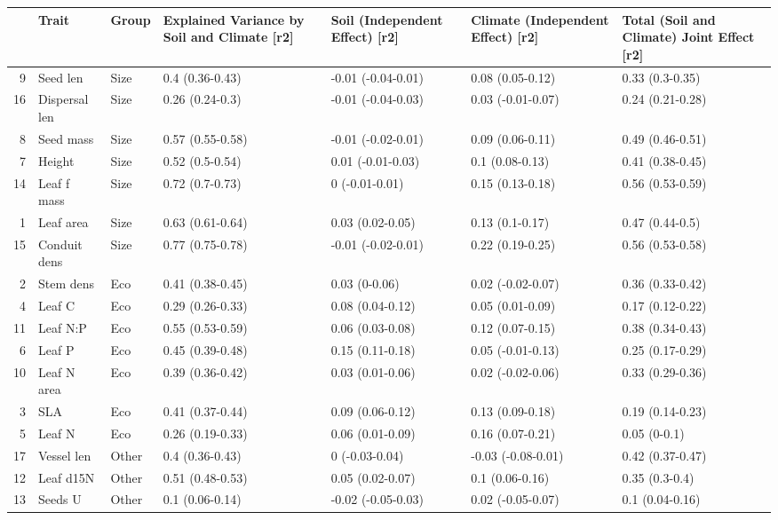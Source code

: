 \begin{table}[ht]
\centering
\begin{tabular}{rllllll}
  \hline
 & Trait & Group & Explained Variance by Soil and Climate [r2] & Soil (Independent Effect) [r2] & Climate (Independent Effect) [r2] & Total (Soil and Climate) Joint Effect [r2] \\ 
  \hline
9 & Seed len & Size & 0.4 (0.36-0.43) & -0.01 (-0.04-0.01) & 0.08 (0.05-0.12) & 0.33 (0.3-0.35) \\ 
  16 & Dispersal len & Size & 0.26 (0.24-0.3) & -0.01 (-0.04-0.03) & 0.03 (-0.01-0.07) & 0.24 (0.21-0.28) \\ 
  8 & Seed mass & Size & 0.57 (0.55-0.58) & -0.01 (-0.02-0.01) & 0.09 (0.06-0.11) & 0.49 (0.46-0.51) \\ 
  7 & Height & Size & 0.52 (0.5-0.54) & 0.01 (-0.01-0.03) & 0.1 (0.08-0.13) & 0.41 (0.38-0.45) \\ 
  14 & Leaf f mass & Size & 0.72 (0.7-0.73) & 0 (-0.01-0.01) & 0.15 (0.13-0.18) & 0.56 (0.53-0.59) \\ 
  1 & Leaf area & Size & 0.63 (0.61-0.64) & 0.03 (0.02-0.05) & 0.13 (0.1-0.17) & 0.47 (0.44-0.5) \\ 
  15 & Conduit dens & Size & 0.77 (0.75-0.78) & -0.01 (-0.02-0.01) & 0.22 (0.19-0.25) & 0.56 (0.53-0.58) \\ 
  2 & Stem dens & Eco & 0.41 (0.38-0.45) & 0.03 (0-0.06) & 0.02 (-0.02-0.07) & 0.36 (0.33-0.42) \\ 
  4 & Leaf C & Eco & 0.29 (0.26-0.33) & 0.08 (0.04-0.12) & 0.05 (0.01-0.09) & 0.17 (0.12-0.22) \\ 
  11 & Leaf N:P & Eco & 0.55 (0.53-0.59) & 0.06 (0.03-0.08) & 0.12 (0.07-0.15) & 0.38 (0.34-0.43) \\ 
  6 & Leaf P & Eco & 0.45 (0.39-0.48) & 0.15 (0.11-0.18) & 0.05 (-0.01-0.13) & 0.25 (0.17-0.29) \\ 
  10 & Leaf N area & Eco & 0.39 (0.36-0.42) & 0.03 (0.01-0.06) & 0.02 (-0.02-0.06) & 0.33 (0.29-0.36) \\ 
  3 & SLA & Eco & 0.41 (0.37-0.44) & 0.09 (0.06-0.12) & 0.13 (0.09-0.18) & 0.19 (0.14-0.23) \\ 
  5 & Leaf N & Eco & 0.26 (0.19-0.33) & 0.06 (0.01-0.09) & 0.16 (0.07-0.21) & 0.05 (0-0.1) \\ 
  17 & Vessel len & Other & 0.4 (0.36-0.43) & 0 (-0.03-0.04) & -0.03 (-0.08-0.01) & 0.42 (0.37-0.47) \\ 
  12 & Leaf d15N & Other & 0.51 (0.48-0.53) & 0.05 (0.02-0.07) & 0.1 (0.06-0.16) & 0.35 (0.3-0.4) \\ 
  13 & Seeds U & Other & 0.1 (0.06-0.14) & -0.02 (-0.05-0.03) & 0.02 (-0.05-0.07) & 0.1 (0.04-0.16) \\ 
   \hline
\end{tabular}
\end{table}
